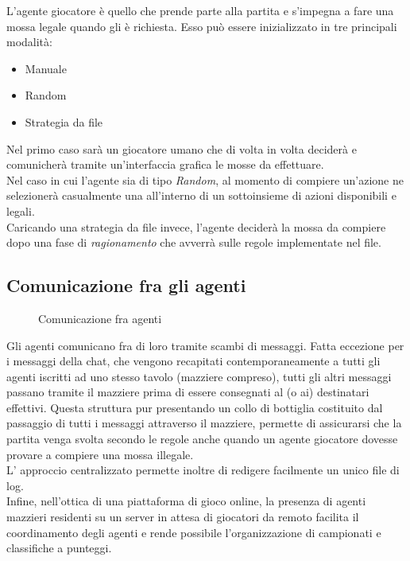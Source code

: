 L'agente giocatore è quello che prende parte alla partita e s'impegna a fare una mossa legale quando gli è richiesta.
Esso può essere inizializzato in tre principali modalità:
\begin{itemize}
   \item Manuale
   \item Random
   \item Strategia da file 
\end{itemize}
Nel primo caso sarà un giocatore umano che di volta in volta deciderà e comunicherà tramite un'interfaccia grafica le mosse da effettuare.\\
Nel caso in cui l'agente sia di tipo \emph{Random}, al momento di compiere un'azione ne selezionerà casualmente una all'interno di un sottoinsieme di azioni disponibili e legali.\\
Caricando una strategia da file invece, l'agente deciderà la mossa da compiere dopo una fase di \emph{ragionamento} che avverrà sulle regole implementate nel file.\\



\subsection{Comunicazione fra gli agenti}

\begin{figure}[!htb]
\centering
{}%
\hfill
{}%
\hfill
{}%
\caption{Comunicazione fra agenti} \label{fig:architettura}
\end{figure}

Gli agenti comunicano fra di loro tramite scambi di messaggi.
Fatta eccezione per i messaggi della chat, che vengono recapitati contemporaneamente a tutti gli agenti iscritti ad uno stesso tavolo (mazziere compreso), tutti gli altri messaggi passano tramite il mazziere prima di essere consegnati al (o ai) destinatari effettivi.
Questa struttura pur presentando un collo di bottiglia costituito dal passaggio di tutti i messaggi attraverso il mazziere, permette di assicurarsi che la partita venga svolta secondo le regole anche quando un agente giocatore dovesse provare a compiere una mossa illegale.\\
L' approccio centralizzato permette inoltre di redigere facilmente un unico file di log.\\
Infine, nell'ottica di una piattaforma di gioco online, la presenza di agenti mazzieri residenti su un server in attesa di giocatori da remoto facilita il coordinamento degli agenti e rende possibile l'organizzazione di campionati e classifiche a punteggi.\\

